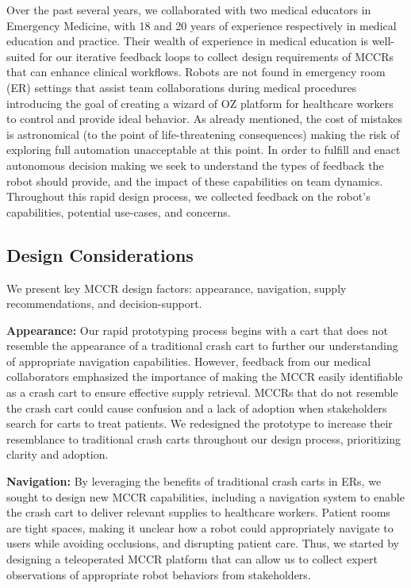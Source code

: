 
Over the past several years, we collaborated with two medical educators in Emergency Medicine, with 18 and 20 years of experience respectively in medical education and practice. Their wealth of experience in medical education is well-suited for our iterative feedback loops to collect design requirements of MCCRs that can enhance clinical workflows. 
Robots are not found in emergency room (ER) settings that assist team collaborations during medical procedures introducing the goal of creating a wizard of OZ platform for healthcare workers to control and provide ideal behavior. 
As already mentioned, the cost of mistakes is astronomical (to the point of life-threatening consequences) making the risk of exploring full automation unacceptable at this point. 
In order to fulfill and enact autonomous decision making we seek to understand the types of feedback the robot should provide, and the impact of these capabilities on team dynamics.
Throughout this rapid design process, we collected feedback on the robot's capabilities, potential use-cases, and concerns. 

 

\subsection{Design Considerations}

We present key MCCR design factors: appearance, navigation, supply recommendations, and decision-support.

\textbf{Appearance:} Our rapid prototyping process begins with a cart that does not resemble the appearance of a traditional crash cart to further our understanding of appropriate navigation capabilities. 
However, feedback from our medical collaborators emphasized the importance of making the MCCR easily identifiable as a crash cart to ensure effective supply retrieval. 
MCCRs that do not resemble the crash cart could cause confusion and a lack of adoption when stakeholders search for carts to treat patients. 
We redesigned the prototype to increase their resemblance to traditional crash carts throughout our design process, prioritizing clarity and adoption.

\textbf{Navigation:} By leveraging the benefits of traditional crash carts in ERs, we sought to design new MCCR capabilities, including a navigation system to enable the crash cart to deliver relevant supplies to healthcare workers.
Patient rooms are tight spaces, making it unclear how a robot could appropriately navigate to users while avoiding occlusions, and disrupting patient care.
Thus, we started by designing a teleoperated MCCR platform that can allow us to collect expert observations of appropriate robot behaviors from stakeholders. 

